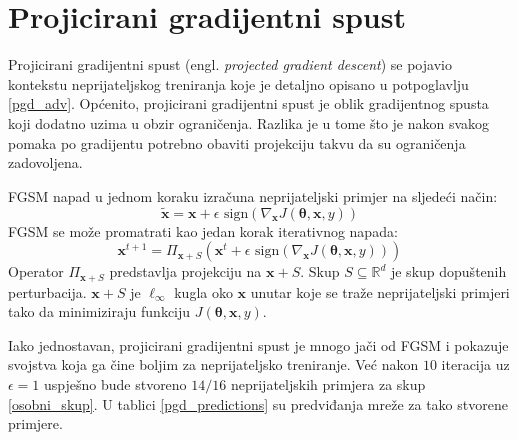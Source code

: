 \documentclass[utf8, diplomski]{fer}
\begin{document}
\section{Projicirani gradijentni spust}\label{pgd_attack} Projicirani gradijentni spust (engl. \textit{projected gradient descent}) se pojavio kontekstu neprijateljskog treniranja koje je detaljno opisano u potpoglavlju \ref{pgd_adv}. Općenito, projicirani gradijentni spust je oblik gradijentnog spusta koji dodatno uzima u obzir ograničenja. Razlika je u tome što je nakon svakog pomaka po gradijentu potrebno obaviti projekciju takvu da su ograničenja zadovoljena. \par 
FGSM napad u jednom koraku izračuna neprijateljski primjer na sljedeći način:
\begin{equation}
	\boldsymbol{\tilde{x}} = \boldsymbol{x} + \epsilon \text{ sign}(\nabla_{\boldsymbol{x}} J(\boldsymbol{\theta}, \boldsymbol{x}, y)) 
\end{equation}
FGSM se može promatrati kao jedan korak iterativnog napada:
\begin{equation}
	\boldsymbol{x}^{t+1} = \Pi_{\boldsymbol{x}+S} (\boldsymbol{x}^{t} + \epsilon \text{ sign}(\nabla_{\boldsymbol{x}} J(\boldsymbol{\theta}, \boldsymbol{x}, y)))
\end{equation}
Operator $\Pi_{\boldsymbol{x}+S}$ predstavlja projekciju na $\boldsymbol{x}+S$. Skup $S \subseteq \mathbb{R}^{d}$ je skup dopuštenih perturbacija. $\boldsymbol{x}+S$ je $\ell_{\infty}$ kugla oko $\boldsymbol{x}$ unutar koje se traže neprijateljski primjeri tako da minimiziraju funkciju $J(\boldsymbol{\theta}, \boldsymbol{x}, y)$. \par

Iako jednostavan, projicirani gradijentni spust je mnogo jači od FGSM i pokazuje svojstva koja ga čine boljim za neprijateljsko treniranje. Već nakon $10$ iteracija uz $\epsilon = 1$ uspješno bude stvoreno $14/16$ neprijateljskih primjera za skup \ref{osobni_skup}. U tablici \ref{pgd_predictions} su predviđanja mreže za tako stvorene primjere. 
\end{document}
